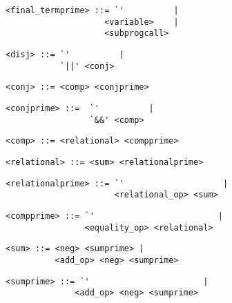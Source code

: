 \begin{footnotesize}
\begin{lstlisting}[frame=single, label={final_termprime}, language=pie]
<final_termprime> ::= `'          |
                    <variable>    |
                    <subprogcall>
\end{lstlisting}

\begin{lstlisting}[frame=single, label={disj}, language=pie]
<disj> ::= `'          |
           `||' <conj>
\end{lstlisting}

\begin{lstlisting}[frame=single, label={conj}, language=pie]
<conj> ::= <comp> <conjprime>
\end{lstlisting}

\begin{lstlisting}[frame=single, label={conjprime}, language=pie]
<conjprime> ::=  `'          |
                 `&&' <comp>
\end{lstlisting}

\begin{lstlisting}[frame=single, label={comp}, language=pie]
<comp> ::= <relational> <compprime>
\end{lstlisting}

\begin{lstlisting}[frame=single, label={relational}, language=pie]
<relational> ::= <sum> <relationalprime>
\end{lstlisting}

\begin{lstlisting}[frame=single, label={relationalprime}, language=pie]
<relationalprime> ::= `'                    |
                      <relational_op> <sum>
\end{lstlisting}

\begin{lstlisting}[frame=single, label={compprime}, language=pie]
<compprime> ::= `'                         |
                <equality_op> <relational>
\end{lstlisting}

\begin{lstlisting}[frame=single, label={sum}, language=pie]
<sum> ::= <neg> <sumprime> |
          <add_op> <neg> <sumprime>
\end{lstlisting}

\begin{lstlisting}[frame=single, label={sumprime}, language=pie]
<sumprime> ::= `'                       |
              <add_op> <neg> <sumprime>
\end{lstlisting}


\end{footnotesize}
